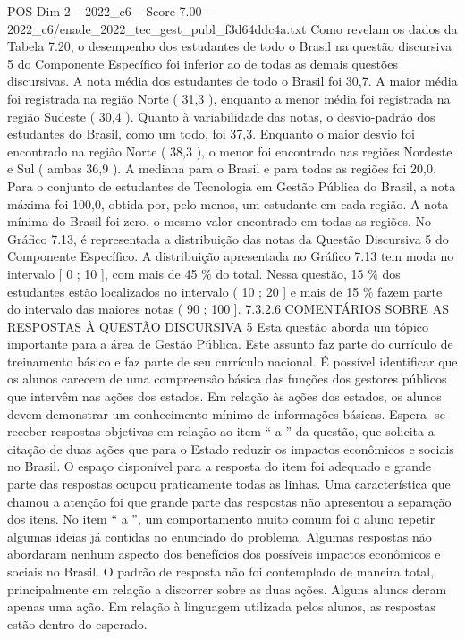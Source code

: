 \begin{textsample}{POS Dim 2 – 2022\_c6 – Score 7.00 – 2022\_c6/enade\_2022\_tec\_gest\_publ\_f3d64ddc4a.txt}
Como revelam os dados da Tabela 7.20, o desempenho dos estudantes de todo o Brasil na questão discursiva 5 do Componente Específico foi inferior ao de todas as demais questões discursivas.
A nota média dos estudantes de todo o Brasil foi 30,7.
A maior média foi registrada na região Norte ( 31,3 ), enquanto a menor média foi registrada na região Sudeste ( 30,4 ).
Quanto à variabilidade das notas, o desvio-padrão dos estudantes do Brasil, como um todo, foi 37,3.
Enquanto o maior desvio foi encontrado na região Norte ( 38,3 ), o menor foi encontrado nas regiões Nordeste e Sul ( ambas 36,9 ).
A mediana para o Brasil e para todas as regiões foi 20,0.
Para o conjunto de estudantes de Tecnologia em Gestão Pública do Brasil, a nota máxima foi 100,0, obtida por, pelo menos, um estudante em cada região.
A nota mínima do Brasil foi zero, o mesmo valor encontrado em todas as regiões.
No Gráfico 7.13, é representada a distribuição das notas da Questão Discursiva 5 do Componente Específico.
A distribuição apresentada no Gráfico 7.13 tem moda no intervalo [ 0 ; 10 ], com mais de 45 \% do total.
Nessa questão, 15 \% dos estudantes estão localizados no intervalo ( 10 ; 20 ] e mais de 15 \% fazem parte do intervalo das maiores notas ( 90 ; 100 ]. 7.3.2.6 COMENTÁRIOS SOBRE AS RESPOSTAS À QUESTÃO DISCURSIVA 5 Esta questão aborda um tópico importante para a área de Gestão Pública.
Este assunto faz parte do currículo de treinamento básico e faz parte de seu currículo nacional.
É possível identificar que os alunos carecem de uma compreensão básica das funções dos gestores públicos que intervêm nas ações dos estados.
Em relação às ações dos estados, os alunos devem demonstrar um conhecimento mínimo de informações básicas.
Espera -se receber respostas objetivas em relação ao item “ a ” da questão, que solicita a citação de duas ações que para o Estado reduzir os impactos econômicos e sociais no Brasil.
O espaço disponível para a resposta do item foi adequado e grande parte das respostas ocupou praticamente todas as linhas.
Uma característica que chamou a atenção foi que grande parte das respostas não apresentou a separação dos itens.
No item “ a ”, um comportamento muito comum foi o aluno repetir algumas ideias já contidas no enunciado do problema.
Algumas respostas não abordaram nenhum aspecto dos benefícios dos possíveis impactos econômicos e sociais no Brasil.
O padrão de resposta não foi contemplado de maneira total, principalmente em relação a discorrer sobre as duas ações.
Alguns alunos deram apenas uma ação.
Em relação à linguagem utilizada pelos alunos, as respostas estão dentro do esperado.

\end{textsample}
